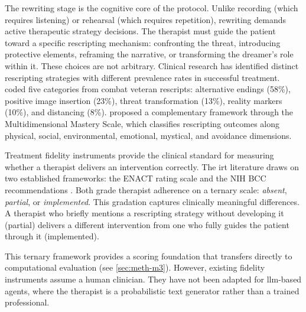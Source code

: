 The rewriting stage is the cognitive core of the protocol. Unlike recording
(which requires listening) or rehearsal (which requires repetition), rewriting
demands active therapeutic strategy decisions. The therapist must guide the
patient toward a specific rescripting mechanism: confronting the threat,
introducing protective elements, reframing the narrative, or transforming the
dreamer's role within it. These choices are not arbitrary. Clinical research
has identified distinct rescripting strategies with different prevalence rates
in successful treatment. \textcite{25UR8BHJ} coded five categories from
combat veteran rescripts: alternative endings (58\%), positive image insertion
(23\%), threat transformation (13\%), reality markers (10\%), and distancing
(8\%). \textcite{62ZMHBC3} proposed a complementary framework through the
Multidimensional Mastery Scale, which classifies rescripting outcomes along
physical, social, environmental, emotional, mystical, and avoidance
dimensions.

Treatment fidelity instruments provide the clinical standard for measuring
whether a therapist delivers an intervention correctly. The \gls{irt}
literature draws on two established frameworks: the ENACT rating
scale \parencite{GYNNP2CC} and the NIH BCC recommendations
\parencite{ITT882KN}. Both grade therapist adherence on a ternary scale:
\emph{absent}, \emph{partial}, or \emph{implemented}. This gradation
captures clinically meaningful differences. A therapist who briefly mentions
a rescripting strategy without developing it (partial) delivers a different
intervention from one who fully guides the patient through it (implemented).

This ternary framework provides a scoring foundation that transfers directly
to computational evaluation (see \autoref{sec:meth-m3}). However, existing
fidelity instruments assume a human clinician. They have not been adapted for
\gls{llm}-based agents, where the therapist is a probabilistic text generator
rather than a trained professional.



